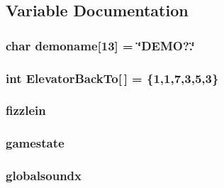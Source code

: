 \subsection{Variable Documentation}
\hypertarget{WL__GAME_8C_acb52b6551afe5f2e9728a26e53761134}{
\subsubsection[{demoname}]{\setlength{\rightskip}{0pt plus 5cm}char {\bf demoname}\mbox{[}13\mbox{]} = \char`\"{}DEMO?.\char`\"{}}}
\label{WL__GAME_8C_acb52b6551afe5f2e9728a26e53761134}
\hypertarget{WL__GAME_8C_a9c3f6257e040f08360ea804736ff8565}{
\subsubsection[{ElevatorBackTo}]{\setlength{\rightskip}{0pt plus 5cm}int {\bf ElevatorBackTo}\mbox{[}$\,$\mbox{]} = \{1,1,7,3,5,3\}}}
\label{WL__GAME_8C_a9c3f6257e040f08360ea804736ff8565}
\hypertarget{WL__GAME_8C_acfcefdf2f47adc93363a7557a347accd}{
\subsubsection[{fizzlein}]{ {\bf fizzlein}}}
\label{WL__GAME_8C_acfcefdf2f47adc93363a7557a347accd}
\hypertarget{WL__GAME_8C_a3aae581094bd3233febed90eb582c70d}{
\subsubsection[{gamestate}]{ {\bf gamestate}}}
\label{WL__GAME_8C_a3aae581094bd3233febed90eb582c70d}
\hypertarget{WL__GAME_8C_aa6ef54cae097d6dcf5978bfb47878b38}{
\subsubsection[{globalsoundx}]{ {\bf globalsoundx}}}
